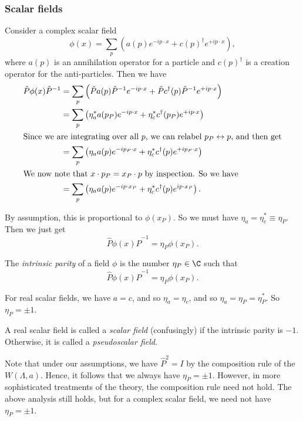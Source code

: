 \documentclass[a4paper]{article}
\begin{document}
\subsubsection*{Scalar fields}
Consider a complex scalar field
\[
  \phi(x) = \sum_p \left(a(p) e^{-ip\cdot x} + c(p)^\dagger e^{+i p\cdot x}\right),
\]
where $a(p)$ is an annihilation operator for a particle and $c(p)^\dagger$ is a creation operator for the anti-particles. Then we have
\begin{align*}
  \hat{P} \phi(x) \hat{P}^{-1} &= \sum_p \left(\hat{P}a(p)\hat{P}^{-1} e^{-ip\cdot x} + \hat{P}c^\dagger (p)\hat{P}^{-1} e^{+ip\cdot x}\right)\\
  &= \sum_p \left(\eta_a^* a(p_P) e^{-ip\cdot x} + \eta_c^* c^\dagger (p_P) e^{+ip\cdot x}\right)\\
  \intertext{Since we are integrating over all $p$, we can relabel $p_P \leftrightarrow p$, and then get}
  &= \sum_p \left(\eta_a a(p) e^{-i p_P \cdot x} + \eta_c^* c^\dagger(p) e^{+ip_P \cdot x}\right)\\
  \intertext{We now note that $x \cdot p_P = x_P \cdot p$ by inspection. So we have}
  &= \sum_p\left(\eta_a a(p) e^{-ip\cdot x_P} + \eta_c^* c^\dagger(p) e^{ip\cdot x_P}\right).
\end{align*}

By assumption, this is proportional to $\phi(x_P)$. So we must have $\eta_a = \eta_c^* \equiv \eta_P$. Then we just get
\[
  \hat{P} \phi(x) \hat{P}^{-1} = \eta_P \phi(x_P).
\]
\begin{defi}
  The \emph{intrinsic parity} of a field $\phi$ is the number $\eta_P \in \C$ such that
  \[
    \hat{P} \phi(x) \hat{P}^{-1} = \eta_P \phi(x_P).
  \]
\end{defi}

For real scalar fields, we have $a = c$, and so $\eta_a = \eta_c$, and so $\eta_a = \eta_P = \eta_P^*$. So $\eta_P = \pm 1$.
\begin{defi}
  A real scalar field is called a \emph{scalar field} (confusingly) if the intrinsic parity is $-1$. Otherwise, it is called a \emph{pseudoscalar field}.
\end{defi}

Note that under our assumptions, we have $\hat{P}^2 = I$ by the composition rule of the $W(\Lambda, a)$. Hence, it follows that we always have $\eta_P = \pm 1$. However, in more sophisticated treatments of the theory, the composition rule need not hold. The above analysis still holds, but for a complex scalar field, we need not have $\eta_P = \pm 1$.
\end{document}
